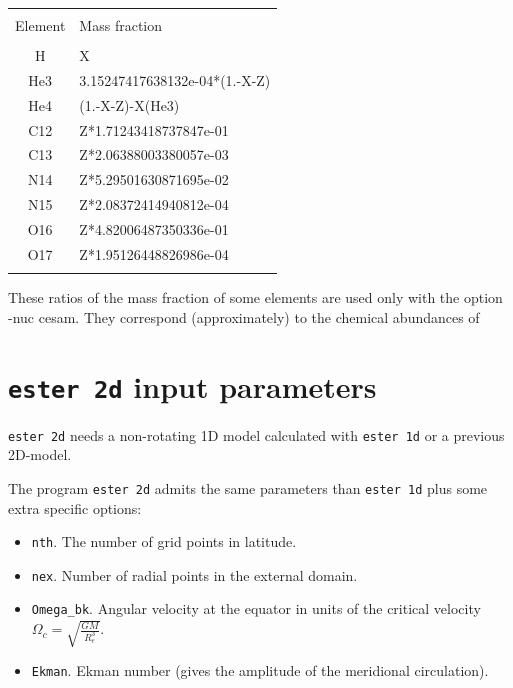 \begin{center}

\begin{tabular}{c|l}
\hline
	   &   \\
	Element & Mass fraction \\
	   &   \\
        H  & X \\
        He3  & 3.15247417638132e-04*(1.-X-Z) \\
        He4  & (1.-X-Z)-X(He3) \\
        C12  & Z*1.71243418737847e-01 \\
        C13  & Z*2.06388003380057e-03 \\
        N14  & Z*5.29501630871695e-02 \\
        N15  & Z*2.08372414940812e-04 \\
        O16  & Z*4.82006487350336e-01 \\
        O17  & Z*1.95126448826986e-04 \\
	   &   \\
\hline
\end{tabular}

\end{center}

These ratios of the mass fraction of some elements are used only with
the option -nuc cesam. They correspond (approximately) to the chemical
abundances of \cite{GS98}



\section{{\tt ester 2d} input parameters}

{\tt ester 2d} needs a non-rotating 1D model
calculated with {\tt ester 1d} or a previous 2D-model.

The program {\tt ester 2d} admits the same parameters than {\tt ester 1d}
plus some extra specific options:

\begin{itemize}
\item {\tt nth}. The number of grid points in latitude.
\item {\tt nex}. Number of radial points in the external domain.
\item {\tt Omega\_bk}. Angular velocity at the equator in units of the critical velocity
$\Omega_c=\sqrt{\frac{GM}{R_e^3}}$.
\item {\tt Ekman}. Ekman number (gives the amplitude of the meridional circulation).
\end{itemize}

